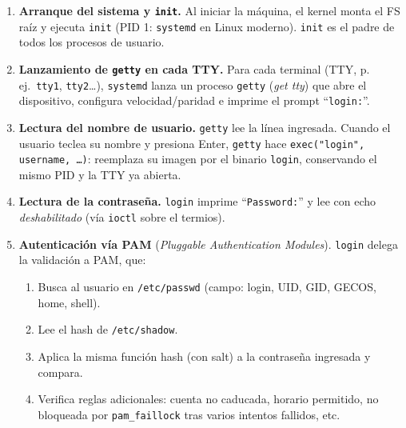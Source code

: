 \documentclass[11pt,a4paper]{article}
\begin{document}
\begin{enumerate}[leftmargin=*]
    \item \textbf{Arranque del sistema y \texttt{init}.}
        Al iniciar la máquina, el kernel monta el FS raíz y ejecuta
        \texttt{init} (PID 1: \texttt{systemd} en Linux moderno).
        \texttt{init} es el padre de todos los procesos de usuario.

    \item \textbf{Lanzamiento de \texttt{getty} en cada TTY.}
        Para cada terminal (TTY, p.\,ej.\ \texttt{tty1},
        \texttt{tty2}\ldots), \texttt{systemd} lanza un proceso
        \texttt{getty} (\emph{get tty}) que abre el dispositivo,
        configura velocidad/paridad e imprime el prompt
        ``\texttt{login:}''.

    \item \textbf{Lectura del nombre de usuario.}
        \texttt{getty} lee la línea ingresada. Cuando el usuario
        teclea su nombre y presiona Enter, \texttt{getty} hace
        \texttt{exec("login", username, \ldots)}: reemplaza su imagen
        por el binario \texttt{login}, conservando el mismo PID y la
        TTY ya abierta.

    \item \textbf{Lectura de la contraseña.}
        \texttt{login} imprime ``\texttt{Password:}'' y lee con echo
        \emph{deshabilitado} (vía \texttt{ioctl} sobre el termios).

    \item \textbf{Autenticación vía PAM} (\emph{Pluggable
        Authentication Modules}).
        \texttt{login} delega la validación a PAM, que:
        \begin{enumerate}[label=\alph*),nosep]
            \item Busca al usuario en \texttt{/etc/passwd} (campo:
                login, UID, GID, GECOS, home, shell).
            \item Lee el hash de \texttt{/etc/shadow}.
            \item Aplica la misma función hash (con salt) a la
                contraseña ingresada y compara.
            \item Verifica reglas adicionales: cuenta no caducada,
                horario permitido, no bloqueada por
                \texttt{pam\_faillock} tras varios intentos
                fallidos, etc.
        \end{enumerate}


\end{enumerate}
\end{document}
